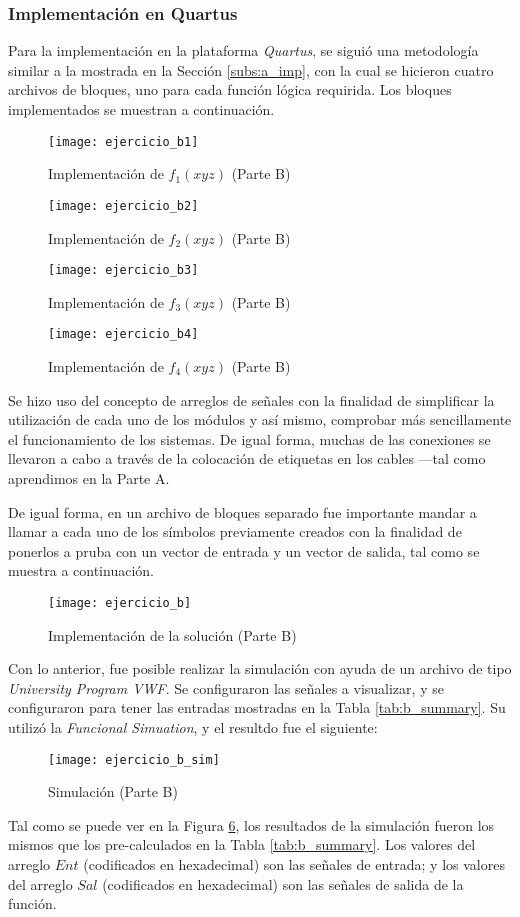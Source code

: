 \documentclass[../procedimientos.tex]{subfiles}
\begin{document}
\subsubsection{Implementación en Quartus}
Para la implementación en la plataforma \textit{Quartus}, se siguió una 
metodología similar a la mostrada en la Sección \ref{subs:a_imp}, con la cual 
se hicieron cuatro archivos de bloques, uno para cada función lógica 
requirida. Los bloques implementados se muestran a continuación.
\begin{figure}[H]
  \texttt{[image: ejercicio\_b1]}
  \caption{Implementación de $f_1(xyz)$ (Parte B)}
  \label{fig:b_f1}
\end{figure}
\begin{figure}[H]
  \texttt{[image: ejercicio\_b2]}
  \caption{Implementación de $f_2(xyz)$ (Parte B)}
  \label{fig:b_f2}
\end{figure}
\begin{figure}[H]
  \texttt{[image: ejercicio\_b3]}
  \caption{Implementación de $f_3(xyz)$ (Parte B)}
  \label{fig:b_f3}
\end{figure}
\begin{figure}[H]
  \texttt{[image: ejercicio\_b4]}
  \caption{Implementación de $f_4(xyz)$ (Parte B)}
  \label{fig:b_f4}
\end{figure}

Se hizo uso del concepto de arreglos de señales con la finalidad de 
simplificar la utilización de cada uno de los módulos y así mismo, comprobar 
más sencillamente el funcionamiento de los sistemas. De igual forma, muchas de 
las conexiones se llevaron a cabo a través de la colocación de etiquetas en 
los cables ---tal como aprendimos en la Parte A.

De igual forma, en un archivo de bloques separado fue importante mandar a 
llamar a cada uno de los símbolos previamente creados con la finalidad de 
ponerlos a pruba con un vector de entrada y un vector de salida, tal como se 
muestra a continuación.
\begin{figure}[H]
  \texttt{[image: ejercicio\_b]}
  \caption{Implementación de la solución (Parte B)}
  \label{fig:b_complete}
\end{figure}

Con lo anterior, fue posible realizar la simulación con ayuda de un archivo de 
tipo \textit{University Program VWF}. Se configuraron las señales a 
visualizar, y se configuraron para tener las entradas mostradas en la Tabla 
\ref{tab:b_summary}. Su utilizó la \textit{Funcional Simuation}, y el resultdo 
fue el siguiente:
\begin{figure}[H]
  \texttt{[image: ejercicio\_b\_sim]}
  \caption{Simulación (Parte B)}
  \label{fig:b_sim}
\end{figure}

Tal como se puede ver en la Figura \ref{fig:b_sim}, los resultados de la 
simulación fueron los mismos que los pre-calculados en la Tabla 
\ref{tab:b_summary}. Los valores del arreglo $Ent$ (codificados en 
hexadecimal) son las señales de entrada; y los valores del arreglo $Sal$ 
(codificados en hexadecimal) son las señales de salida de la función.
\end{document}
